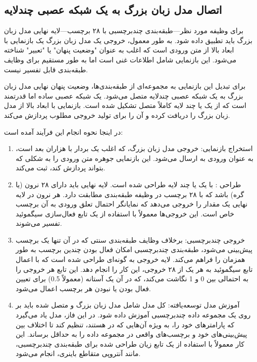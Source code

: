 \subsection{اتصال مدل زبان بزرگ به یک شبکه عصبی چندلایه }

برای وظیفه مورد نظر—طبقه‌بندی چند‌برچسبی با ۲۸ برچسب—لایه نهایی مدل زبان بزرگ باید تطبیق داده شود. به طور معمول، خروجی یک مدل زبان بزرگ یک بازنمایی با ابعاد بالا از متن ورودی است که اغلب به عنوان "وضعیت پنهان" یا "تعبیر" شناخته می‌شود. این بازنمایی شامل اطلاعات غنی است اما به طور مستقیم برای وظایف طبقه‌بندی قابل تفسیر نیست.

برای تبدیل این بازنمایی به مجموعه‌ای از طبقه‌بندی‌ها، وضعیت پنهان نهایی مدل زبان بزرگ به یک شبکه عصبی چندلایه  متصل می‌شود.  یک شبکه عصبی ساده اما قدرتمند است که از یک یا چند لایه کاملاً متصل تشکیل شده است.  بازنمایی با ابعاد بالا از مدل زبان بزرگ را دریافت کرده و آن را برای تولید خروجی مطلوب پردازش می‌کند.

در اینجا نحوه انجام این فرآیند آمده است:
\begin{enumerate}
	\item
	      استخراج بازنمایی: خروجی مدل زبان بزرگ، که اغلب یک بردار با هزاران بعد است، به عنوان ورودی به  ارسال می‌شود. این بازنمایی جوهره متن ورودی را به شکلی که  بتواند پردازش کند، ثبت می‌کند.
	\item
	      طراحی :  با یک یا چند لایه طراحی شده است. لایه نهایی  باید دارای ۲۸ نرون (یا گره) باشد که با ۲۸ برچسب در وظیفه طبقه‌بندی مطابقت دارد. هر نرون در لایه نهایی یک مقدار را خروجی می‌دهد که نمایانگر احتمال تعلق ورودی به آن برچسب خاص است. این خروجی‌ها معمولاً با استفاده از یک تابع فعال‌سازی سیگموئید تفسیر می‌شوند.

	\item
	      خروجی چند‌برچسبی: برخلاف وظایف طبقه‌بندی سنتی که در آن تنها یک برچسب پیش‌بینی می‌شود، طبقه‌بندی چند‌برچسبی امکان فعال بودن چندین برچسب به طور همزمان را فراهم می‌کند. لایه خروجی  به گونه‌ای طراحی شده است که با اعمال تابع سیگموئید به هر یک از ۲۸ خروجی، این کار را انجام دهد. این تابع هر خروجی را به احتمالی بین 0 و 1 نگاشت می‌کند، که در آن یک آستانه (معمولاً 0.5) برای تعیین فعال بودن یا نبودن هر برچسب اعمال می‌شود.

	\item
	      آموزش مدل توسعه‌یافته: کل مدل شامل مدل زبان بزرگ و  متصل شده باید بر روی یک مجموعه داده چندبرچسبی آموزش داده شود. در این فاز، مدل یاد می‌گیرد که پارامترهای خود را، به ویژه آن‌هایی که در  هستند، تنظیم کند تا اختلاف بین پیش‌بینی‌های خود و برچسب‌های واقعی در مجموعه داده را به حداقل برساند. این کار معمولاً با استفاده از یک تابع زیان طراحی شده برای طبقه‌بندی چندبرچسبی، مانند آنتروپی متقاطع باینری، انجام می‌شود.
\end{enumerate}

